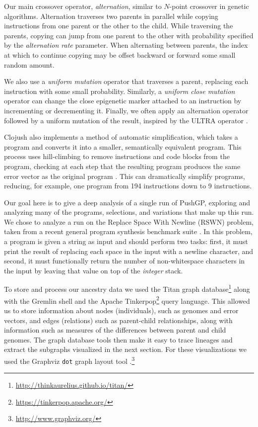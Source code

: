 \documentclass[graybox]{svmult}
\begin{document}
Our main crossover operator, \textit{alternation}, similar to $N$-point crossover in genetic algorithms.
Alternation traverses two parents in parallel while copying instructions from one parent or 
the other to the child. While traversing the parents, copying can jump from one parent to the other with probability specified by the \textit{alternation rate} parameter. When alternating between parents, the index at which to continue copying may be offset backward or forward some small random amount.

We also use a \textit{uniform mutation} operator that traverses a parent, 
replacing each instruction with some small probability. Similarly, a 
\textit{uniform close mutation} operator can change the close epigenetic marker 
attached to an instruction by incrementing or decrementing it. Finally, we 
often apply an alternation operator followed by a uniform mutation of the 
result, inspired by the ULTRA operator \cite{Spector:2013:GPTP}.

Clojush also implements a method of automatic simplification, which takes a program and 
converts it into a smaller, semantically equivalent program. This process uses 
hill-climbing to remove instructions and code blocks from the program, checking 
at each step that the resulting program produces the same error vector as the 
original program \cite{Spector:2014:GECCOcomp}. This can dramatically simplify programs, reducing, for example, one program from 194 instructions down to 9 instructions.

Our goal here is to give a deep analysis of a single run of PushGP, exploring and analyzing many of the programs, selections, and variations that make up this run. We chose to analyze a run on the Replace Space With Newline (RSWN) problem, taken from a recent general program synthesis benchmark suite \cite{Helmuth:2015:GECCO}. In this problem, a program is given a string as input and should perform two tasks: first, it must print the result of replacing each space in the input with a newline character, and second, it must functionally return the number of non-whitespace characters in the input by leaving that value on top of the \emph{integer} stack. 

To store and process our ancestry data we used the Titan graph 
database\footnote{\url{http://thinkaurelius.github.io/titan/}} along with the 
Gremlin shell and the Apache Tinkerpop\footnote{\url{https://tinkerpop.apache.org/}} query language. This 
allowed us to store information about nodes (individuals), such as genomes
and error vectors, and edges (relations) such as parent-child relationships,
along with information such as measures of the differences between parent
and child genomes. The graph database tools then make it easy to trace lineages and extract the subgraphs visualized in the next section. For these visualizations we used the
Graphviz \texttt{dot} graph layout tool
.\footnote{\url{http://www.graphviz.org/}}
\end{document}
